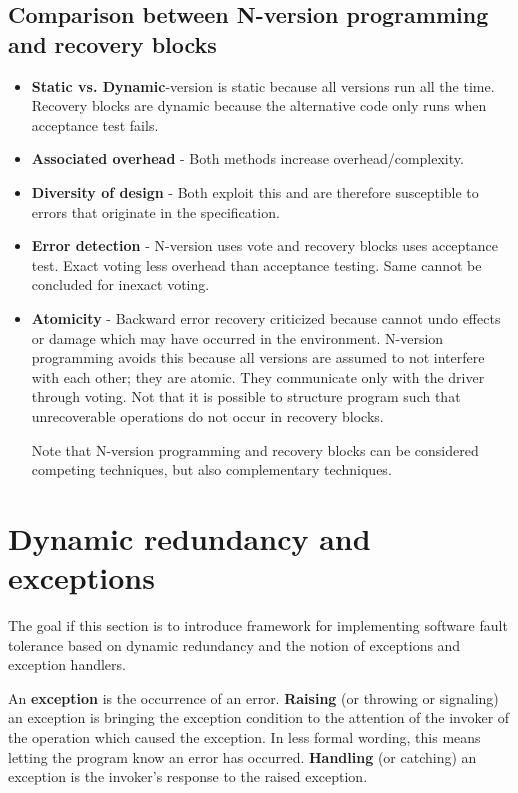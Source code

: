 \subsection{Comparison between N-version programming and recovery blocks}
\begin{itemize}
\item \textbf{Static vs. Dynamic}-version is static because all versions run all the time. Recovery blocks are dynamic because the alternative code only runs when acceptance test fails.
\item \textbf{Associated overhead} - Both methods increase overhead/complexity.
\item \textbf{Diversity of design} - Both exploit this and are therefore susceptible to errors that originate in the specification.
\item \textbf{Error detection} - N-version uses vote and recovery blocks uses acceptance test. Exact voting less overhead than acceptance testing. Same cannot be concluded for inexact voting.
\item \textbf{Atomicity} - Backward error recovery criticized because cannot undo effects or damage which may have occurred in the environment. N-version programming avoids this because all versions are assumed to not interfere with each other; they are atomic. They communicate only with the driver through voting. Not that it is possible to structure program such that unrecoverable operations do not occur in recovery blocks.

Note that N-version programming and recovery blocks can be considered competing techniques, but also complementary techniques.
\end{itemize}

\section{Dynamic redundancy and exceptions}


The goal if this section is to introduce framework for implementing software fault tolerance based on dynamic redundancy and the notion of exceptions and exception handlers.

An \textbf{exception} is the occurrence of an error. \textbf{Raising} (or throwing or signaling) an exception is bringing the exception condition to the attention of the invoker of the operation which caused the exception. In less formal wording, this means letting the program know an error has occurred. \textbf{Handling} (or catching) an exception is the invoker's response to the raised exception.

